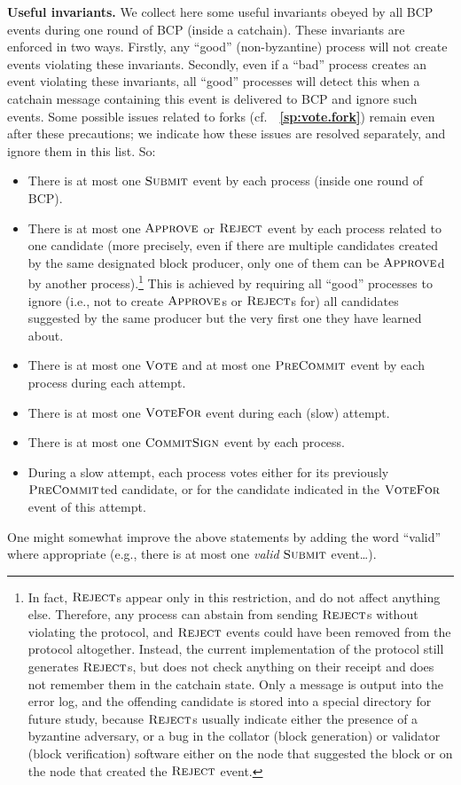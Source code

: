\documentclass[12pt,oneside]{article}
\def\makepoint#1{\medbreak\noindent{\bf #1.\ }}
\def\nxsubpoint{\refstepcounter{subsubsection}%
  \smallbreak\makepoint{\thesubsubsection}}
\def\refpoint#1{{\rm\textbf{\ref{#1}}}}
\let\ptref=\refpoint
\def\emb#1{\textbf{#1.}}
\def\opsc#1{\operatorname{\textsc{#1}}}
\def\Submit{\opsc{Submit}}
\def\Approve{\opsc{Approve}}
\def\Reject{\opsc{Reject}}
\def\PreCommit{\opsc{PreCommit}}
\def\CommitSign{\opsc{CommitSign}}
\def\Vote{\opsc{Vote}}
\def\VoteFor{\opsc{VoteFor}}
\begin{document}
\nxsubpoint\emb{Useful invariants}
We collect here some useful invariants obeyed by all BCP events during one round of BCP (inside a catchain). These invariants are enforced in two ways. Firstly, any ``good'' (non-byzantine) process will not create events violating these invariants. Secondly, even if a ``bad'' process creates an event violating these invariants, all ``good'' processes will detect this when a catchain message containing this event is delivered to BCP and ignore such events. Some possible issues related to forks (cf.~~\ptref{sp:vote.fork}) remain even after these precautions; we indicate how these issues are resolved separately, and ignore them in this list. So:
\begin{itemize}
\item There is at most one $\Submit$ event by each process (inside one round of BCP).
\item There is at most one $\Approve$ or $\Reject$ event by each process related to one candidate (more precisely, even if there are multiple candidates created by the same designated block producer, only one of them can be $\Approve$d by another process).\footnote{In fact, $\Reject$s appear only in this restriction, and do not affect anything else. Therefore, any process can abstain from sending $\Reject$s without violating the protocol, and $\Reject$ events could have been removed from the protocol altogether. Instead, the current implementation of the protocol still generates $\Reject$s, but does not check anything on their receipt and does not remember them in the catchain state. Only a message is output into the error log, and the offending candidate is stored into a special directory for future study, because $\Reject$s usually indicate either the presence of a byzantine adversary, or a bug in the collator (block generation) or validator (block verification) software either on the node that suggested the block or on the node that created the $\Reject$ event.} This is achieved by requiring all ``good'' processes to ignore (i.e., not to create $\Approve$s or $\Reject$s for) all candidates suggested by the same producer but the very first one they have learned about.
\item There is at most one $\Vote$ and at most one $\PreCommit$ event by each process during each attempt.
\item There is at most one $\VoteFor$ event during each (slow) attempt.
\item There is at most one $\CommitSign$ event by each process.
\item During a slow attempt, each process votes either for its previously $\PreCommit$ted candidate, or for the candidate indicated in the $\VoteFor$ event of this attempt.
\end{itemize}
One might somewhat improve the above statements by adding the word ``valid'' where appropriate (e.g., there is at most one {\em valid\/} $\Submit$ event\dots).
\end{document}
